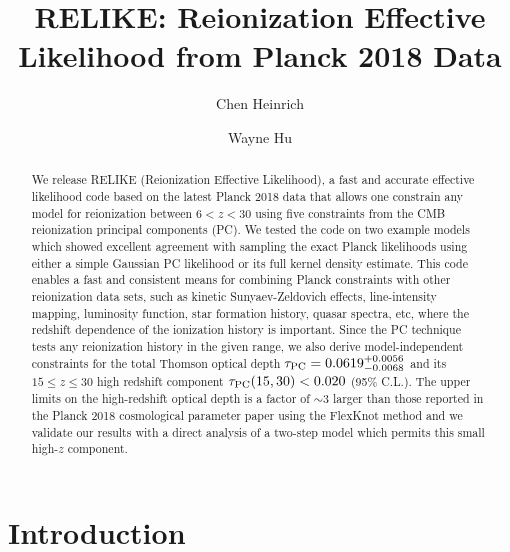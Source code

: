 \documentclass[aps,prd,twocolumn,amsmath,amssymb,showpacs,floatfix,superscriptaddress,nofootinbib]{revtex4-1}
\begin{document}
	
\title{RELIKE: Reionization Effective Likelihood from Planck 2018 Data} 

\author{Chen Heinrich}

\author{Wayne Hu}

\begin{abstract}

We release RELIKE (Reionization Effective Likelihood), a fast and accurate effective likelihood code based on the latest Planck 2018 data 
that allows one constrain any model for reionization between $6 < z < 30$ using five constraints from the CMB reionization principal components (PC). We tested the code on two example models which showed excellent agreement with sampling the exact Planck likelihoods using either a simple Gaussian PC likelihood or its full kernel density estimate.
This code enables a fast and consistent means for 
combining Planck constraints with other reionization data sets, such as kinetic Sunyaev-Zeldovich effects, line-intensity mapping, luminosity function, star formation history, quasar spectra, etc, where the redshift dependence of the ionization history is important.  
Since the PC technique tests any reionization history in the given range, we also derive model-independent constraints for the total Thomson optical depth $\tau_{\rm PC} = 0.0619^{+0.0056}_{-0.0068}$ and its $15\le z \le 30$ high redshift component $\tau_{\rm PC}(15, 30) < 0.020 $ (95\% C.L.).
The upper limits on the high-redshift optical depth is a factor of $\sim3$ larger than those reported in the Planck 2018 cosmological parameter paper using the FlexKnot method
and we validate our results with a direct analysis of a two-step model which permits this small high-$z$ component.

\end{abstract}

\maketitle

\section{Introduction}
\label{sec:intro}
\end{document}
